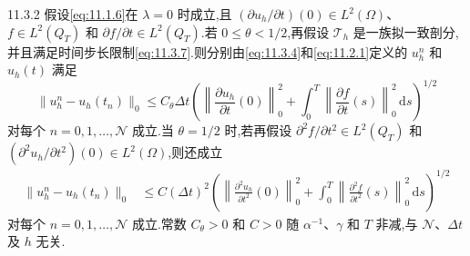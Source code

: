 \begin{theorem}[收敛性]{11.3.2}
假设\eqref{eq:11.1.6}在 \(\lambda=0\) 时成立,且 \((\partial u_h/\partial t)(0)\in L^2(\Omega)\)、\(f\in L^2(Q_T)\) 和 \(\partial f/\partial t\in L^2(Q_T)\).若 \(0\le\theta<1/2\),再假设 \(\mathcal T_h\) 是一族拟一致剖分,并且满足时间步长限制\eqref{eq:11.3.7}.则分别由\eqref{eq:11.3.4}和\eqref{eq:11.2.1}定义的 \(u_h^n\) 和 \(u_h(t)\) 满足
\begin{equation}\label{eq:11.3.13}
  \|u_h^n-u_h(t_n)\|_0
     \le C_\theta\Delta t\left(
          \left\|\frac{\partial u_h}{\partial t}(0)\right\|_0^2
          +\int_0^T\left\|\frac{\partial f}{\partial t}(s)\right\|_0^2\,\mathrm ds
                   \right)^{1/2}
\end{equation}
对每个 \(n=0,1,\ldots,\mathcal N\) 成立.当 \(\theta=1/2\) 时,若再假设 \(\partial^2f/\partial t^2\in L^2(Q_T)\) 和 \((\partial^2u_h/\partial t^2)(0)\in L^2(\Omega)\),则还成立
\begin{equation}\label{eq:11.3.14}
  \begin{aligned}
    \|u_h^n-u_h(t_n)\|_0
     &\le C(\Delta t)^2\left(
         \left\|\frac{\partial^2u_h}{\partial t^2}(0)\right\|_0^2
         +\int_0^T\left\|\frac{\partial^2f}{\partial t^2}(s)\right\|_0^2\,\mathrm ds
                           \right)^{1/2}
  \end{aligned}
\end{equation}
对每个 \(n=0,1,\ldots,\mathcal N\) 成立.常数 \(C_\theta>0\) 和 \(C>0\) 随 \(\alpha^{-1}\)、\(\gamma\) 和 \(T\) 非减,与 \(\mathcal N\)、\(\Delta t\) 及 \(h\) 无关.
\end{theorem}

